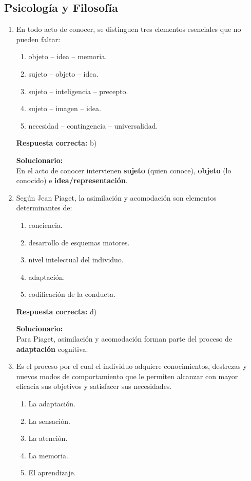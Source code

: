\subsection*{Psicología y Filosofía}

\begin{enumerate}
	
	\item  En todo acto de conocer, se distinguen tres elementos esenciales que no pueden faltar:
	\begin{enumerate}[label=\alph*)]
		\item objeto -- idea -- memoria.
		\item sujeto -- objeto -- idea.
		\item sujeto -- inteligencia -- precepto.
		\item sujeto -- imagen -- idea.
		\item necesidad -- contingencia -- universalidad.
	\end{enumerate}
	
	\textbf{Respuesta correcta:} b)
	
	\vspace{2mm}
	\textbf{Solucionario:}\\
	En el acto de conocer intervienen \textbf{sujeto} (quien conoce), \textbf{objeto} (lo conocido) e \textbf{idea/representación}.
	
	\item  Según Jean Piaget, la asimilación y acomodación son elementos determinantes de:
	\begin{enumerate}[label=\alph*)]
		\item conciencia.
		\item desarrollo de esquemas motores.
		\item nivel intelectual del individuo.
		\item adaptación.
		\item codificación de la conducta.
	\end{enumerate}
	
	\textbf{Respuesta correcta:} d)
	
	\vspace{2mm}
	\textbf{Solucionario:}\\
	Para Piaget, asimilación y acomodación forman parte del proceso de \textbf{adaptación} cognitiva.
	
	\item  Es el proceso por el cual el individuo adquiere conocimientos, destrezas y nuevos modos de comportamiento que le permiten alcanzar con mayor eficacia sus objetivos y satisfacer sus necesidades.
	\begin{enumerate}[label=\alph*)]
		\item La adaptación.
		\item La sensación.
		\item La atención.
		\item La memoria.
		\item El aprendizaje.
	\end{enumerate}
	

\end{enumerate}
